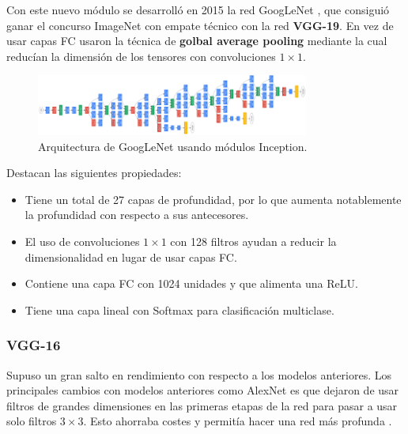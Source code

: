         \noindent Con este nuevo módulo se desarrolló en 2015 la red GoogLeNet \cite{szegedy2015going}, que consiguió ganar el concurso ImageNet con empate técnico con la red \textbf{VGG-19}. En vez de usar capas FC usaron la técnica de \textbf{golbal average pooling} mediante la cual reducían la dimensión de los tensores con convoluciones $1 \times 1$.

        \begin{figure}[!h]
            \centering
            \includegraphics[width=0.8\textwidth]{img/GoogLeNet.png}
            \caption{Arquitectura de GoogLeNet usando módulos Inception.}
            \label{fig:GoogLeNet}
        \end{figure}

        \noindent Destacan las siguientes propiedades:

        \begin{itemize}
            \item Tiene un total de 27 capas de profundidad, por lo que aumenta notablemente la profundidad con respecto a sus antecesores.
            \item El uso de convoluciones $1\times 1$ con 128 filtros ayudan a reducir la dimensionalidad en lugar de usar capas FC.
            \item Contiene una capa FC con 1024 unidades y que alimenta una ReLU. 
            \item Tiene una capa lineal con Softmax para clasificación multiclase.
        \end{itemize}

    \subsubsection{VGG-16}
        \noindent Supuso un gran salto en rendimiento con respecto a los modelos anteriores. Los principales cambios con modelos anteriores como AlexNet es que dejaron de usar filtros de grandes dimensiones en las primeras etapas de la red para pasar a usar solo filtros $3 \times 3$. Esto ahorraba costes y permitía hacer una red más profunda \cite{simonyan2014very}.

